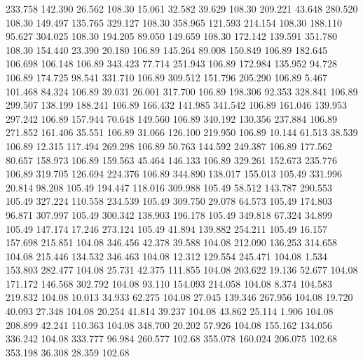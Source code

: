  233.758  142.390   26.562       108.30
  15.061   32.582   39.629       108.30
 209.221   43.648  280.520       108.30
 149.497  135.765  329.127       108.30
 358.965  121.593  214.154       108.30
 188.110   95.627  304.025       108.30
 194.205   89.050  149.659       108.30
 172.142  139.591  351.780       108.30
 154.440   23.390   20.180       106.89
 145.264   89.008  150.849       106.89
 182.645  106.698  106.148       106.89
 343.423   77.714  251.943       106.89
 172.984  135.952   94.728       106.89
 174.725   98.541  331.710       106.89
 309.512  151.796  205.290       106.89
   5.467  101.468   84.324       106.89
  39.031   26.001  317.700       106.89
 198.306   92.353  328.841       106.89
 299.507  138.199  188.241       106.89
 166.432  141.985  341.542       106.89
 161.046  139.953  297.242       106.89
 157.944   70.648  149.560       106.89
 340.192  130.356  237.884       106.89
 271.852  161.406   35.551       106.89
  31.066  126.100  219.950       106.89
  10.144   61.513   38.539       106.89
  12.315  117.494  269.298       106.89
  50.763  144.592  249.387       106.89
 177.562   80.657  158.973       106.89
 159.563   45.464  146.133       106.89
 329.261  152.673  235.776       106.89
 319.705  126.694  224.376       106.89
 344.890  138.017  155.013       105.49
 331.996   20.814   98.208       105.49
 194.447  118.016  309.988       105.49
  58.512  143.787  290.553       105.49
 327.224  110.558  234.539       105.49
 309.750   29.078   64.573       105.49
 174.803   96.871  307.997       105.49
 300.342  138.903  196.178       105.49
 349.818   67.324   34.899       105.49
 147.174   17.246  273.124       105.49
  41.894  139.882  254.211       105.49
  16.157  157.698  215.851       104.08
 346.456   42.378   39.588       104.08
 212.090  136.253  314.658       104.08
 215.446  134.532  346.463       104.08
  12.312  129.554  245.471       104.08
   1.534  153.803  282.477       104.08
  25.731   42.375  111.855       104.08
 203.622   19.136   52.677       104.08
 171.172  146.568  302.792       104.08
  93.110  154.093  214.058       104.08
   8.374  104.583  219.832       104.08
  10.013   34.933   62.275       104.08
  27.045  139.346  267.956       104.08
  19.720   40.093   27.348       104.08
  20.254   41.814   39.237       104.08
  43.862   25.114    1.906       104.08
 208.899   42.241  110.363       104.08
 348.700   20.202   57.926       104.08
 155.162  134.056  336.242       104.08
 333.777   96.984  260.577       102.68
 355.078  160.024  206.075       102.68
 353.198   36.308   28.359       102.68
